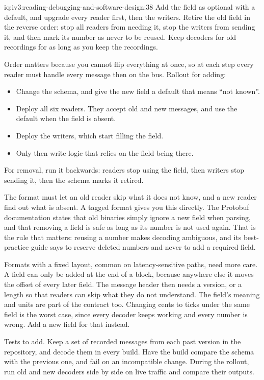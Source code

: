 \begin{solution}{iq:iv3:reading-debugging-and-software-design:38}
Add the field as optional with a default, and upgrade every reader first, then the writers. Retire the old field in the reverse order: stop all readers from needing it, stop the writers from sending it, and then mark its number as never to be reused. Keep decoders for old recordings for as long as you keep the recordings.

Order matters because you cannot flip everything at once, so at each step every reader must handle every message then on the bus. Rollout for adding:
\begin{itemize}
\item Change the schema, and give the new field a default that means ``not known''.
\item Deploy all six readers. They accept old and new messages, and use the default when the field is absent.
\item Deploy the writers, which start filling the field.
\item Only then write logic that relies on the field being there.
\end{itemize}
For removal, run it backwards: readers stop using the field, then writers stop sending it, then the schema marks it retired.

The format must let an old reader skip what it does not know, and a new reader find out what is absent. A tagged format gives you this directly. The Protobuf documentation states that old binaries simply ignore a new field when parsing, and that removing a field is safe as long as its number is not used again. That is the rule that matters: reusing a number makes decoding ambiguous, and its best-practice guide says to reserve deleted numbers and never to add a required field.

Formats with a fixed layout, common on latency-sensitive paths, need more care. A field can only be added at the end of a block, because anywhere else it moves the offset of every later field. The message header then needs a version, or a length so that readers can skip what they do not understand. The field's meaning and units are part of the contract too. Changing cents to ticks under the same field is the worst case, since every decoder keeps working and every number is wrong. Add a new field for that instead.

Tests to add. Keep a set of recorded messages from each past version in the repository, and decode them in every build. Have the build compare the schema with the previous one, and fail on an incompatible change. During the rollout, run old and new decoders side by side on live traffic and compare their outputs.


\end{solution}
